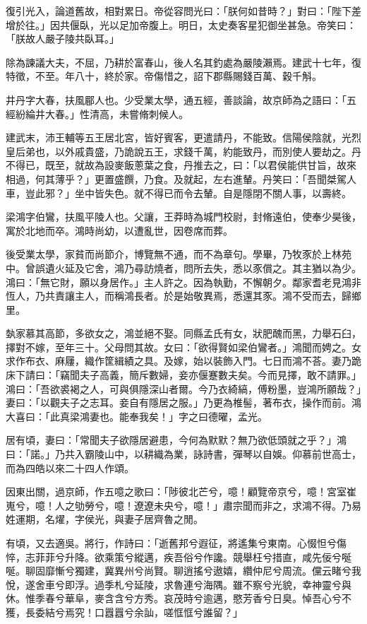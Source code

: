 \begin{pinyinscope}
復引光入，論道舊故，相對累日。帝從容問光曰：「朕何如昔時？」對曰：「陛下差增於往。」因共偃臥，光以足加帝腹上。明日，太史奏客星犯御坐甚急。帝笑曰：「朕故人嚴子陵共臥耳。」

除為諫議大夫，不屈，乃耕於富春山，後人名其釣處為嚴陵瀨焉。建武十七年，復特徵，不至。年八十，終於家。帝傷惜之，詔下郡縣賜錢百萬、穀千斛。

井丹字大春，扶風郿人也。少受業太學，通五經，善談論，故京師為之語曰：「五經紛綸井大春。」性清高，未嘗脩刺候人。

建武末，沛王輔等五王居北宮，皆好賓客，更遣請丹，不能致。信陽侯陰就，光烈皇后弟也，以外戚貴盛，乃詭說五王，求錢千萬，約能致丹，而別使人要劫之。丹不得已，既至，就故為設麥飯蔥葉之食，丹推去之，曰：「以君侯能供甘旨，故來相過，何其薄乎？」更置盛饌，乃食。及就起，左右進輦。丹笑曰：「吾聞桀駕人車，豈此邪？」坐中皆失色。就不得已而令去輦。自是隱閉不關人事，以壽終。

梁鴻字伯鸞，扶風平陵人也。父讓，王莽時為城門校尉，封脩遠伯，使奉少昊後，寓於北地而卒。鴻時尚幼，以遭亂世，因卷席而葬。

後受業太學，家貧而尚節介，博覽無不通，而不為章句。學畢，乃牧豕於上林苑中。曾誤遺火延及它舍，鴻乃尋訪燒者，問所去失，悉以豕償之。其主猶以為少。鴻曰：「無它財，願以身居作。」主人許之。因為執勤，不懈朝夕。鄰家耆老見鴻非恆人，乃共責讓主人，而稱鴻長者。於是始敬異焉，悉還其豕。鴻不受而去，歸鄉里。

埶家慕其高節，多欲女之，鴻並絕不娶。同縣孟氏有女，狀肥醜而黑，力舉石臼，擇對不嫁，至年三十。父母問其故。女曰：「欲得賢如梁伯鸞者。」鴻聞而娉之。女求作布衣、麻屨，織作筐緝績之具。及嫁，始以裝飾入門。七日而鴻不荅。妻乃跪床下請曰：「竊聞夫子高義，簡斥數婦，妾亦偃蹇數夫矣。今而見擇，敢不請罪。」鴻曰：「吾欲裘褐之人，可與俱隱深山者爾。今乃衣綺縞，傅粉墨，豈鴻所願哉？」妻曰：「以觀夫子之志耳。妾自有隱居之服。」乃更為椎髻，著布衣，操作而前。鴻大喜曰：「此真梁鴻妻也。能奉我矣！」字之曰德曜，孟光。

居有頃，妻曰：「常聞夫子欲隱居避患，今何為默默？無乃欲低頭就之乎？」鴻曰：「諾。」乃共入霸陵山中，以耕織為業，詠詩書，彈琴以自娛。仰慕前世高士，而為四皓以來二十四人作頌。

因東出關，過京師，作五噫之歌曰：「陟彼北芒兮，噫！顧覽帝京兮，噫！宮室崔嵬兮，噫！人之劬勞兮，噫！遼遼未央兮，噫！」肅宗聞而非之，求鴻不得。乃易姓運期，名燿，字侯光，與妻子居齊魯之閒。

有頃，又去適吳。將行，作詩曰：「逝舊邦兮遐征，將遙集兮東南。心惙怛兮傷悴，志菲菲兮升降。欲乘策兮縱邁，疾吾俗兮作讒。競舉枉兮措直，咸先佞兮唌唌。聊固靡慚兮獨建，冀異州兮尚賢。聊逍搖兮遨嬉，纘仲尼兮周流。儻云睹兮我悅，遂舍車兮即浮。過季札兮延陵，求魯連兮海隅。雖不察兮光貌，幸神靈兮與休。惟季春兮華阜，麥含含兮方秀。哀茂時兮逾邁，愍芳香兮日臭。悼吾心兮不獲，長委結兮焉究！口囂囂兮余訕，嗟恇恇兮誰留？」


\end{pinyinscope}
